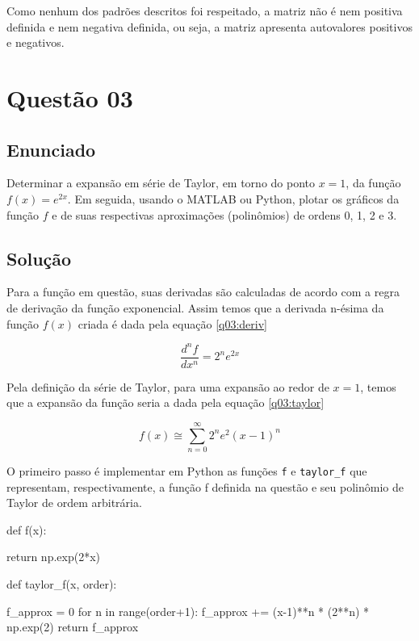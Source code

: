 \documentclass[10pt, a4paper]{article}
\begin{document}
Como nenhum dos padrões descritos foi respeitado, a matriz não é nem 
positiva definida e nem negativa definida, 
ou seja, a matriz apresenta autovalores positivos e negativos.


\section{Questão 03}\label{q03}

\subsection{Enunciado}

Determinar a expansão em série de Taylor, em torno do ponto $x = 1$, 
da função $f(x) = e^{2x}$. Em seguida, usando o MATLAB ou Python, 
plotar os gráficos da função $f$ e de suas respectivas aproximações
(polinômios) de ordens 0, 1, 2 e 3.

\subsection{Solução}

Para a função em questão, suas derivadas são calculadas de acordo com a regra de 
derivação da função exponencial. Assim temos que a derivada n-ésima da função 
$f(x)$ criada é dada pela equação \cref{q03:deriv}

\begin{equation}\label{q03:deriv}
    \frac{d^nf}{dx^n} = 2^n e^{2x}
\end{equation}

Pela definição da série de Taylor, para uma expansão ao redor de $x = 1$, temos 
que a expansão da função seria a dada pela equação \cref{q03:taylor}

\begin{equation}\label{q03:taylor}
    f(x) \cong \sum^{\infty}_{n=0} 2^n e^2 (x-1)^n
\end{equation}

O primeiro passo é implementar em Python as funções {\tt f} e {\tt taylor\_f} que 
representam, respectivamente, a função f definida na questão e seu polinômio 
de Taylor de ordem arbitrária.

\begin{python}
def f(x):

return np.exp(2*x)

def taylor_f(x, order):

f_approx = 0
for n in range(order+1):
    f_approx += (x-1)**n * (2**n) * np.exp(2)
return f_approx
\end{python}
\end{document}
